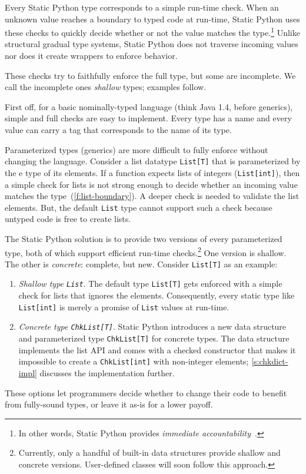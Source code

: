 \documentclass[english,cleveref,submission]{programming}
\newcommand{\SP}{Static Python}
\newcommand{\code}[1]{\texttt{#1}}
\begin{document}
Every \SP{} type corresponds to a simple run-time check.
When an unknown value reaches a boundary to typed code at run-time,
\SP{} uses these checks to quickly decide whether or not the value
matches the type.\footnote{In other words, \SP{} provides \emph{immediate accountability}~\cite{mt-oopsla-2017}.}
Unlike structural gradual type systems, \SP{} does not traverse
incoming values nor does it create wrappers to enforce behavior.

These checks try to faithfully enforce the full type, but some are incomplete.
We call the incomplete ones \emph{shallow} types; examples follow.

First off, for a basic nominally-typed language (think Java 1.4, before
generics), simple and full checks are easy to implement.
Every type has a name and every value can carry a tag that corresponds to the
name of its type.

Parameterized types (generics) are more difficult to fully enforce without
changing the language.
Consider a list datatype \code{List[T]} that is parameterized by the
e type of its elements.
If a function expects lists of integers (\code{List[int]}), then a simple check
for lists is not strong enough to decide whether an incoming value matches the
type~(\cref{f:list-boundary}).
A deeper check is needed to validate the list elements.
But, the default \code{List} type cannot support such a check because untyped
code is free to create lists.

The \SP{} solution is to provide two versions of every parameterized type,
both of which support efficient run-time checks.\footnote{Currently, only a handful
of built-in data structures provide shallow and concrete versions. User-defined
classes will soon follow this approach.}
One version is shallow.
The other is \emph{concrete}: complete, but new.
Consider \code{List[T]} as an example:
\begin{enumerate}
  \item
    \emph{Shallow type \code{List}}.
    The default type \code{List[T]} gets enforced with a simple check for lists that ignores
    the elements.
    Consequently, every static type like \code{List[int]} is merely a promise of \code{List}
    values at run-time.
  \item
    \emph{Concrete type \code{ChkList[T]}}.
    \SP{} introduces a new data structure and parameterized type \code{ChkList[T]}
    for concrete types.
    The data structure implements the list API and comes with a checked constructor that
    makes it impossible to create a \code{ChkList[int]} with non-integer elements;
    \cref{s:chkdict-impl} discusses the implementation further.
\end{enumerate}
%
These options let programmers decide whether to change their code to benefit from
fully-sound types, or leave it as-is for a lower payoff.
\end{document}
